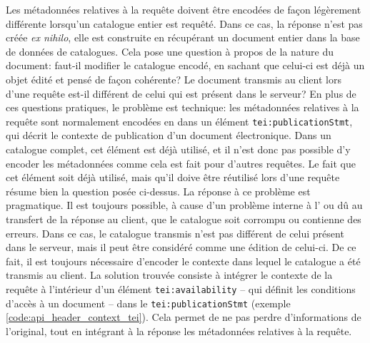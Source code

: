 Les métadonnées relatives à la requête doivent être encodées de façon légèrement différente lorsqu'un catalogue entier est requêté. Dans ce cas, la réponse n'est pas créée \textit{ex nihilo}, elle est construite en récupérant un document entier dans la base de données de catalogues. Cela pose une question à propos de la nature du document: faut-il modifier le catalogue encodé, en sachant que celui-ci est déjà un objet édité et pensé de façon cohérente? Le document transmis au client lors d'une requête est-il différent de celui qui est présent dans le serveur? En plus de ces questions pratiques, le problème est technique: les métadonnées relatives à la requête sont normalement encodées en \tei{} dans un élément \texttt{tei:publicationStmt}, qui décrit le contexte de publication d'un document électronique. Dans un catalogue complet, cet élément est déjà utilisé, et il n'est donc pas possible d'y encoder les métadonnées comme cela est fait pour d'autres requêtes. Le fait que cet élément soit déjà utilisé, mais qu'il doive être réutilisé lors d'une requête résume bien la question posée ci-dessus. La réponse à ce problème est pragmatique. Il est toujours possible, à cause d'un problème interne à l'\api{} ou dû au transfert de la réponse au client, que le catalogue soit corrompu ou contienne des erreurs. Dans ce cas, le catalogue transmis n'est pas différent de celui présent dans le serveur, mais il peut être considéré comme une édition de celui-ci. De ce fait, il est toujours nécessaire d'encoder le contexte dans lequel le catalogue a été transmis au client. La solution trouvée consiste à intégrer le contexte de la requête à l'intérieur d'un élément \texttt{tei:availability} -- qui définit les conditions d'accès à un document -- dans le \texttt{tei:publicationStmt} (exemple \ref{code:api_header_context_tei}). Cela permet de ne pas perdre d'informations de l'original, tout en intégrant à la réponse les métadonnées relatives à la requête.

